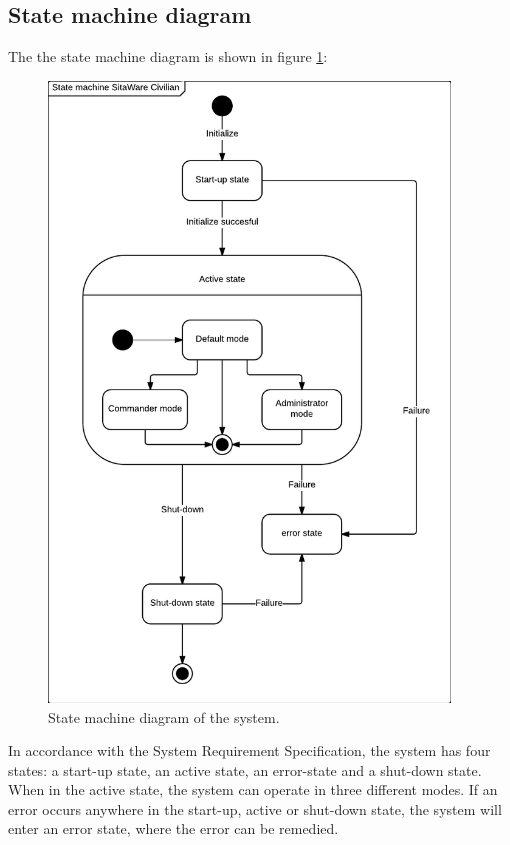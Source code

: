 \subsection{State machine diagram}
The the state machine diagram is shown in figure \ref{fig:state_diagram}:

\begin{figure}[H]
\centering
\includegraphics[width=0.95\textwidth]
{billeder/state_machine_pdd.pdf}
\caption{State machine diagram of the system.}
\label{fig:state_diagram}
\end{figure}

In accordance with the System Requirement Specification, the system has four states: a start-up state, an active state, an error-state and a shut-down state. When in the active state, the system can operate in three different modes. If an error occurs anywhere in the start-up, active or shut-down state, the system will enter an error state, where the error can be remedied.